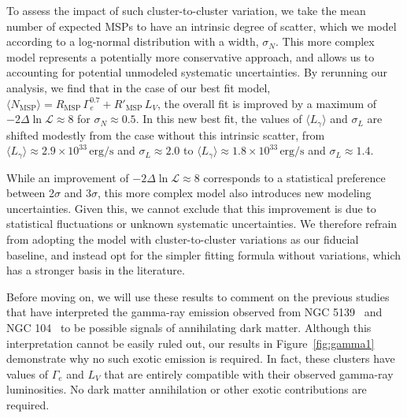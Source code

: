 To assess the impact of such cluster-to-cluster variation, we take the mean number of expected MSPs to have an intrinsic degree of scatter, which we model according to a log-normal distribution with a width, $\sigma_N$. This more complex model represents a potentially more conservative approach, and allows us to accounting for potential unmodeled systematic uncertainties. By rerunning our analysis, we find that in the case of our best fit model, $\langle N_\textrm{MSP}\rangle = R_\textrm{MSP} \, \Gamma_e^{0.7} +R'_\textrm{MSP} \, L_V$, the overall fit is improved by a maximum of $-2\Delta \ln \mathcal{L} \approx 8$ for $\sigma_N \approx 0.5$. In this new best fit, the values of $\langle L_{\gamma} \rangle$ and $\sigma_L$ are shifted modestly from the case without this intrinsic scatter, from $\langle L_{\gamma} \rangle \approx 2.9 \times 10^{33} \, \textrm{erg/s}$ and $\sigma_L \approx 2.0$ to $\langle L_{\gamma} \rangle \approx 1.8\times 10^{33} \, \textrm{erg/s}$ and $\sigma_L \approx 1.4$.

While an improvement of $-2\Delta \ln \mathcal{L} \approx 8$ corresponds to a statistical preference between 2$\sigma$ and 3$\sigma$, this more complex model also introduces new modeling uncertainties. Given this, we cannot exclude that this improvement is due to statistical fluctuations or unknown systematic uncertainties. We therefore refrain from adopting the model with cluster-to-cluster variations as our fiducial baseline, and instead opt for the simpler fitting formula without variations, which has a stronger basis in the literature.



Before moving on, we will use these results to comment on the previous studies that have interpreted the gamma-ray emission observed from NGC 5139~\cite{Reynoso-Cordova:2019biv} and NGC 104~\cite{Brown:2018pwq} to be possible signals of annihilating dark matter. Although this interpretation cannot be easily ruled out, our results in Figure~\ref{fig:gamma1} demonstrate why no such exotic emission is required. In fact, these clusters have values of $\Gamma_e$ and $L_V$ that are entirely compatible with their observed gamma-ray luminosities. No dark matter annihilation or other exotic contributions are required.  

